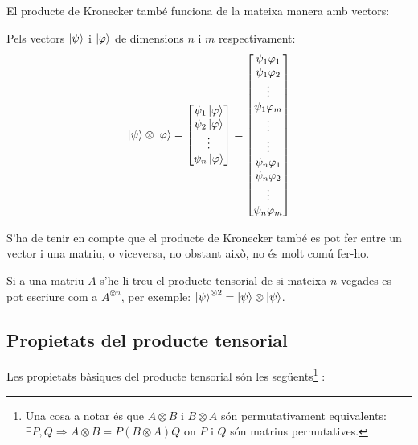 El producte de Kronecker també funciona de la mateixa manera amb vectors:

Pels vectors $\ket{\psi}$ i $\ket{\varphi}$ de dimensions $n$ i $m$ respectivament:
$$
\ket{\psi} \otimes \ket{\varphi} = \begin{bmatrix}
	\psi_{1} \ket{\varphi} \\
	\psi_2 \ket{\varphi} \\
	\vdots \\
	\psi_{n} \ket{\varphi}
\end{bmatrix} = 
\begin{bmatrix}
\psi_{1} \varphi_1 \\
\psi_{1} \varphi_{2} \\
\vdots \\
\psi_{1} \varphi_{m} \\
\vdots \\
\vdots \\
\psi_{n} \varphi_1 \\
\psi_{n} \varphi_{2} \\
\vdots \\
\psi_{n} \varphi_{m} \\
\end{bmatrix}
$$

S'ha de tenir en compte que el producte de Kronecker també es pot fer entre un vector i una matriu, o viceversa, no obstant això, no és molt comú fer-ho.

Si a una matriu $A$ s'he li treu el producte tensorial de si mateixa $n$-vegades es pot escriure com a $A^{\otimes n}$, per exemple:  $\ket{\psi}^{\otimes2} = \ket{\psi}\otimes\ket{\psi}$. 

\subsection{Propietats del producte tensorial}
Les propietats bàsiques del producte tensorial són les següents\footnote{Una cosa a notar és que $A \otimes B$ i $B \otimes A$ són 
	permutativament equivalents: \\ $\exists P, Q \Rightarrow A \otimes B = P (  B \otimes A )Q$ on $P$ i $Q$ són matrius permutatives.}  \cite{QCandQI:tensor_product, wiki:tensor_product}:




